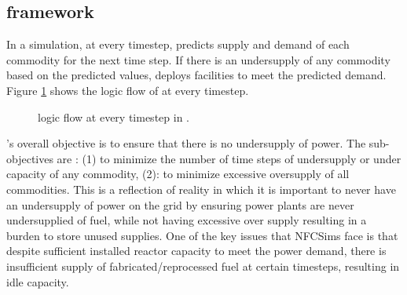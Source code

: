\subsection{\deploy framework}
\label{sec:d3ploy}
In a \Cyclus simulation, at every timestep, \deploy 
predicts supply and demand of each commodity for the next time 
step. 
If there is an undersupply of any commodity based 
on the predicted values, \deploy deploys facilities to meet 
the predicted demand.  
Figure \ref{fig:flow} shows the logic flow of \deploy 
at every timestep. 

\begin{figure}[]
    \centering
    \caption{\deploy logic flow at every timestep in \Cyclus \cite{chee_demonstration_2019}.}
    \label{fig:flow}
\end{figure}

\deploy's overall objective is to ensure that there is no 
undersupply of power. 
The sub-objectives are : (1) to minimize the number of time 
steps of undersupply or under capacity of any 
commodity, (2): to minimize excessive oversupply of all commodities.
This is a reflection of reality in which it is important to 
never have an undersupply of power on the grid by ensuring power 
plants are never undersupplied of fuel, while not 
having excessive over supply resulting in a burden to store unused 
supplies. 
One of the key issues that \gls{NFCSim}s face is that despite
sufficient installed reactor capacity to meet the power 
demand, there is insufficient supply of fabricated/reprocessed 
fuel at certain timesteps, resulting in idle capacity.  

